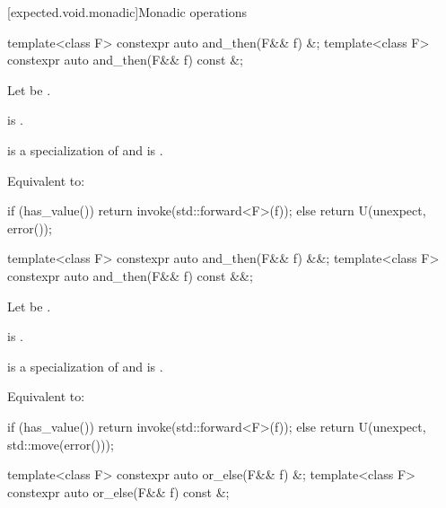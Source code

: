 [expected.void.monadic]{Monadic operations}

%
\begin{itemdecl}
template<class F> constexpr auto and_then(F&& f) &;
template<class F> constexpr auto and_then(F&& f) const &;
\end{itemdecl}

\begin{itemdescr}
\pnum
Let  be .

\pnum
\constraints
{} is .

\pnum
\mandates
{} is a specialization of  and
 is .

\pnum
\effects
Equivalent to:
\begin{codeblock}
if (has_value())
  return invoke(std::forward<F>(f));
else
  return U(unexpect, error());
\end{codeblock}
\end{itemdescr}

%
\begin{itemdecl}
template<class F> constexpr auto and_then(F&& f) &&;
template<class F> constexpr auto and_then(F&& f) const &&;
\end{itemdecl}

\begin{itemdescr}
\pnum
Let  be .

\pnum
\constraints
{} is .

\pnum
\mandates
{} is a specialization of  and
 is .

\pnum
\effects
Equivalent to:
\begin{codeblock}
if (has_value())
  return invoke(std::forward<F>(f));
else
  return U(unexpect, std::move(error()));
\end{codeblock}
\end{itemdescr}

%
\begin{itemdecl}
template<class F> constexpr auto or_else(F&& f) &;
template<class F> constexpr auto or_else(F&& f) const &;
\end{itemdecl}

